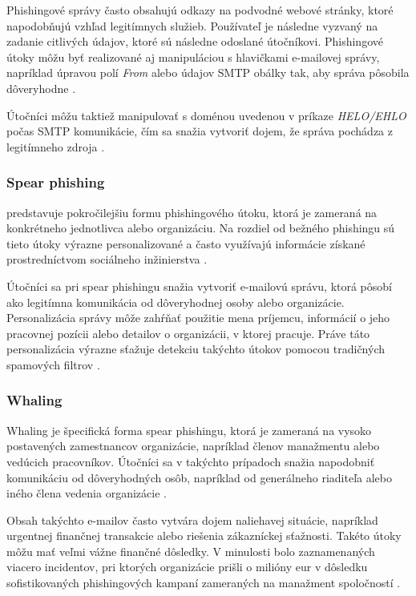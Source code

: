 \documentclass[conference]{IEEEtran}
\begin{document}
Phishingové správy často obsahujú odkazy na podvodné webové stránky, 
ktoré napodobňujú vzhľad legitímnych služieb. Používateľ je následne 
vyzvaný na zadanie citlivých údajov, ktoré sú následne odoslané útočníkovi. 
Phishingové útoky môžu byť realizované aj manipuláciou s hlavičkami 
e-mailovej správy, napríklad úpravou polí \textit{From} alebo údajov 
SMTP obálky tak, aby správa pôsobila dôveryhodne \cite{karim2019spam}.

Útočníci môžu taktiež manipulovať s doménou uvedenou v príkaze 
\textit{HELO/EHLO} počas SMTP komunikácie, čím sa snažia vytvoriť dojem, 
že správa pochádza z legitímneho zdroja \cite{karim2019spam}.

\subsubsection*{Spear phishing}

predstavuje pokročilejšiu formu phishingového útoku, 
ktorá je zameraná na konkrétneho jednotlivca alebo organizáciu. 
Na rozdiel od bežného phishingu sú tieto útoky výrazne personalizované 
a často využívajú informácie získané prostredníctvom sociálneho 
inžinierstva \cite{karim2019spam}.

Útočníci sa pri spear phishingu snažia vytvoriť e-mailovú správu, 
ktorá pôsobí ako legitímna komunikácia od dôveryhodnej osoby alebo 
organizácie. Personalizácia správy môže zahŕňať použitie mena 
príjemcu, informácií o jeho pracovnej pozícii alebo detailov o 
organizácii, v ktorej pracuje. Práve táto personalizácia výrazne 
sťažuje detekciu takýchto útokov pomocou tradičných spamových filtrov 
\cite{karim2019spam}.

\subsubsection*{Whaling}

Whaling je špecifická forma spear phishingu, ktorá je zameraná 
na vysoko postavených zamestnancov organizácie, napríklad členov 
manažmentu alebo vedúcich pracovníkov. Útočníci sa v takýchto 
prípadoch snažia napodobniť komunikáciu od dôveryhodných osôb, 
napríklad od generálneho riaditeľa alebo iného člena vedenia 
organizácie \cite{karim2019spam}.

Obsah takýchto e-mailov často vytvára dojem naliehavej situácie, 
napríklad urgentnej finančnej transakcie alebo riešenia 
zákazníckej sťažnosti. Takéto útoky môžu mať veľmi vážne 
finančné dôsledky. V minulosti bolo zaznamenaných viacero 
incidentov, pri ktorých organizácie prišli o milióny eur v 
dôsledku sofistikovaných phishingových kampaní zameraných 
na manažment spoločností \cite{karim2019spam}.
\end{document}
